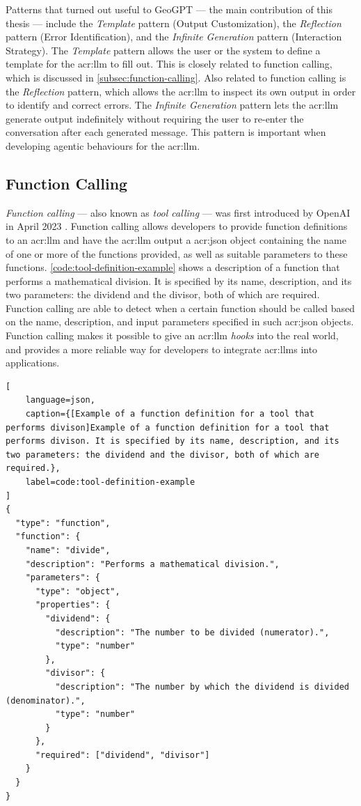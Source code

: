 Patterns that turned out useful to GeoGPT --- the main contribution of this thesis --- include the \textit{Template} pattern (Output Customization), the \textit{Reflection} pattern (Error Identification), and the \textit{Infinite Generation} pattern (Interaction Strategy). The \textit{Template} pattern allows the user or the system to define a template for the \acrshort{acr:llm} to fill out. This is closely related to function calling, which is discussed in \autoref{subsec:function-calling}. Also related to function calling is the \textit{Reflection} pattern, which allows the \acrshort{acr:llm} to inspect its own output in order to identify and correct errors. The \textit{Infinite Generation} pattern lets the \acrshort{acr:llm} generate output indefinitely without requiring the user to re-enter the conversation after each generated message. This pattern is important when developing agentic behaviours for the \acrshort{acr:llm}.


\subsection[Function Calling LLMs]{Function Calling }
\label{subsec:function-calling}

\textit{Function calling} --- also known as \textit{tool calling} --- was first introduced by OpenAI in April 2023 \citep{eletiFunctionCallingOther2023}. Function calling allows developers to provide function definitions to an \gls{acr:llm} and have the \gls{acr:llm} output a \acrshort{acr:json} object containing the name of one or more of the functions provided, as well as suitable parameters to these functions. \autoref{code:tool-definition-example} shows a description of a function that performs a mathematical division. It is specified by its name, description, and its two parameters: the dividend and the divisor, both of which are required. Function calling  are able to detect when a certain function should be called based on the name, description, and input parameters specified in such \acrshort{acr:json} objects. Function calling makes it possible to give an \gls{acr:llm} \textit{hooks} into the real world, and provides a more reliable way for developers to integrate \glspl{acr:llm} into applications.

\begin{lstlisting}[
    language=json,
    caption={[Example of a function definition for a tool that performs divison]Example of a function definition for a tool that performs divison. It is specified by its name, description, and its two parameters: the dividend and the divisor, both of which are required.},
    label=code:tool-definition-example
]
{
  "type": "function",
  "function": {
    "name": "divide",
    "description": "Performs a mathematical division.",
    "parameters": {
      "type": "object",
      "properties": {
        "dividend": {
          "description": "The number to be divided (numerator).",
          "type": "number"
        },
        "divisor": {
          "description": "The number by which the dividend is divided (denominator).",
          "type": "number"
        }
      },
      "required": ["dividend", "divisor"]
    }
  }
}
\end{lstlisting}

